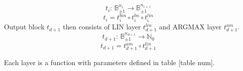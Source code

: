 \documentclass{fithesis}
\newcommand{\BB}{\mathbb{B}}
\newcommand{\NN}{\mathbb{N}}
\begin{document}
\begin{equation*}
    t_i: \, \BB_{\pm 1}^{n_i} \to \BB_{\pm 1}^{n_{i+1}}
\end{equation*}
\begin{equation}
    t_i = t_i^{bin} \circ t_i^{bn} \circ t_i^{lin}
\end{equation}
Output block $t_{d+1}$ then consists of LIN layer $t_{d+1}^{lin}$ and ARGMAX layer
$t_{d+1}^{am}$.
\begin{equation*}
    t_{d+1}: \, \BB_{\pm 1}^{n_{d+1}} \to \NN_0
\end{equation*}
\begin{equation}
    t_{d+1} = t_{d+1}^{am} \circ t_{d+1}^{lin}
\end{equation}

Each layer is a function with parameters defined in table [table num].
\end{document}
